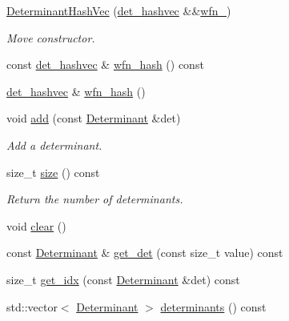 \begin{DoxyCompactItemize}
\mbox{\hyperlink{classforte_1_1_determinant_hash_vec_adda0ea8d50023e6b89493b3cd294ee10}{Determinant\+Hash\+Vec}} (\mbox{\hyperlink{namespaceforte_aee00ff2f656f0aa613d3f9f1ba01cad5}{det\+\_\+hashvec}} \&\&\mbox{\hyperlink{classforte_1_1_determinant_hash_vec_abbbb485c33b1f107c3cafef27cdf5215}{wfn\+\_\+}})
\begin{DoxyCompactList}\small\item\em Move constructor. \end{DoxyCompactList}\item 
const \mbox{\hyperlink{namespaceforte_aee00ff2f656f0aa613d3f9f1ba01cad5}{det\+\_\+hashvec}} \& \mbox{\hyperlink{classforte_1_1_determinant_hash_vec_a9fa3a1a6f30ffd78e70e5a6a23990273}{wfn\+\_\+hash}} () const
\item 
\mbox{\hyperlink{namespaceforte_aee00ff2f656f0aa613d3f9f1ba01cad5}{det\+\_\+hashvec}} \& \mbox{\hyperlink{classforte_1_1_determinant_hash_vec_add576b2713d10d0449dd0cd7b38c7c38}{wfn\+\_\+hash}} ()
\item 
void \mbox{\hyperlink{classforte_1_1_determinant_hash_vec_a704d0c4af99bc018e01e96ca8ae8c9db}{add}} (const \mbox{\hyperlink{namespaceforte_a2076c63fd7b8732004d9e1442ce527c1}{Determinant}} \&det)
\begin{DoxyCompactList}\small\item\em Add a determinant. \end{DoxyCompactList}\item 
size\+\_\+t \mbox{\hyperlink{classforte_1_1_determinant_hash_vec_a65a00ada6f1529a6e82908a4802f6729}{size}} () const
\begin{DoxyCompactList}\small\item\em Return the number of determinants. \end{DoxyCompactList}\item 
void \mbox{\hyperlink{classforte_1_1_determinant_hash_vec_a0a2110402a7e015c08edae95479cf0b9}{clear}} ()
\item 
const \mbox{\hyperlink{namespaceforte_a2076c63fd7b8732004d9e1442ce527c1}{Determinant}} \& \mbox{\hyperlink{classforte_1_1_determinant_hash_vec_a1e68e5960804d59cac572b41a4d6acee}{get\+\_\+det}} (const size\+\_\+t value) const
\item 
size\+\_\+t \mbox{\hyperlink{classforte_1_1_determinant_hash_vec_a1547252a5e500ecb773d5ddac0368d1e}{get\+\_\+idx}} (const \mbox{\hyperlink{namespaceforte_a2076c63fd7b8732004d9e1442ce527c1}{Determinant}} \&det) const
\item 
std\+::vector$<$ \mbox{\hyperlink{namespaceforte_a2076c63fd7b8732004d9e1442ce527c1}{Determinant}} $>$ \mbox{\hyperlink{classforte_1_1_determinant_hash_vec_a42ada8706abb98122961fc5767be15b6}{determinants}} () const

\end{DoxyCompactItemize}
